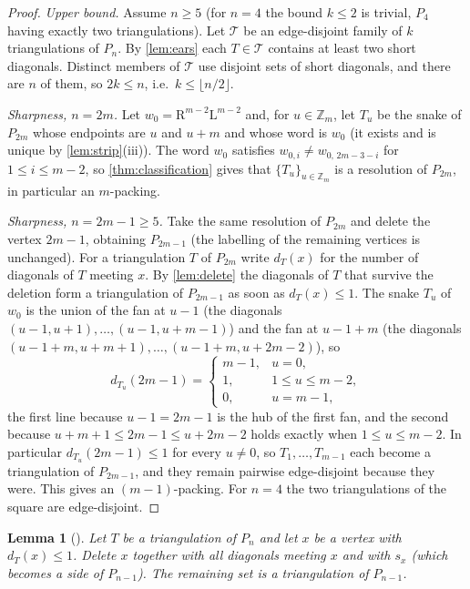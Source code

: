 \documentclass[11pt,a4paper]{article}
\newtheorem{lemma}[theorem]{Lemma}
\theoremstyle{definition}
\theoremstyle{remark}
\newcommand{\Zd}{\ensuremath{\mathbb{Z}}}
\newcommand{\Li}{\mathrm{L}}
\newcommand{\Ri}{\mathrm{R}}
\begin{document}
\begin{proof}
\emph{Upper bound.}  Assume $n\ge5$ (for $n=4$ the bound $k\le2$ is trivial, $P_4$ having
exactly two triangulations).  Let $\mathcal{T}$ be an edge-disjoint family of $k$
triangulations of $P_n$.  By \cref{lem:ears} each $T\in\mathcal{T}$ contains at least two
short diagonals.  Distinct members of $\mathcal{T}$ use disjoint sets of short diagonals, and
there are $n$ of them, so $2k\le n$, i.e.\ $k\le\lfloor n/2\rfloor$.

\emph{Sharpness, $n=2m$.}  Let $w_0=\Ri^{m-2}\Li^{m-2}$ and, for $u\in\Zd_m$, let $T_u$ be
the snake of $P_{2m}$ whose endpoints are $u$ and $u+m$ and whose word is $w_0$ (it exists
and is unique by \cref{lem:strip}(iii)).  The word $w_0$ satisfies
$w_{0,i}\ne w_{0,\,2m-3-i}$ for $1\le i\le m-2$, so \cref{thm:classification} gives that
$\{T_u\}_{u\in\Zd_m}$ is a resolution of $P_{2m}$, in particular an $m$-packing.

\emph{Sharpness, $n=2m-1\ge5$.}  Take the same resolution of $P_{2m}$ and delete the vertex
$2m-1$, obtaining $P_{2m-1}$ (the labelling of the remaining vertices is unchanged).  For a
triangulation $T$ of $P_{2m}$ write $d_T(x)$ for the number of diagonals of $T$ meeting
$x$.  By \cref{lem:delete} the diagonals of $T$ that survive the deletion form a
triangulation of $P_{2m-1}$ as soon as $d_T(x)\le1$.  The snake $T_u$ of $w_0$ is the union
of the fan at $u-1$ (the diagonals $(u-1,u+1),\dots,(u-1,u+m-1)$) and the fan at
$u-1+m$ (the diagonals $(u-1+m,u+m+1),\dots,(u-1+m,u+2m-2)$), so
\[
  d_{T_u}(2m-1)=\begin{cases}m-1,&u=0,\\ 1,&1\le u\le m-2,\\ 0,&u=m-1,\end{cases}
\]
the first line because $u-1=2m-1$ is the hub of the first fan, and the second because
$u+m+1\le 2m-1\le u+2m-2$ holds exactly when $1\le u\le m-2$.  In particular
$d_{T_u}(2m-1)\le1$ for every $u\ne0$, so $T_1,\dots,T_{m-1}$ each become a triangulation of
$P_{2m-1}$, and they remain pairwise edge-disjoint because they were.  This gives an
$(m-1)$-packing.  For $n=4$ the two triangulations of the square are edge-disjoint.
\end{proof}

\begin{lemma}[\label{lem:delete}]
Let $T$ be a triangulation of $P_n$ and let $x$ be a vertex with $d_T(x)\le1$.  Delete $x$
together with all diagonals meeting $x$ and with $s_x$ (which becomes a side of
$P_{n-1}$).  The remaining set is a triangulation of $P_{n-1}$.
\end{lemma}
\end{document}
